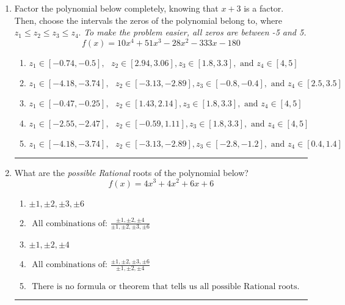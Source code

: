 \documentclass[14pt]{extbook}
\newcommand{\litem}[1]{\item#1\hspace*{-1cm}\rule{\textwidth}{0.4pt}}
\begin{document}
\begin{enumerate}
{\begin{enumerate}[label=\Alph*.]
\end{enumerate} }
\litem{
Factor the polynomial below completely, knowing that $x + 3$ is a factor. Then, choose the intervals the zeros of the polynomial belong to, where $z_1 \leq z_2 \leq z_3 \leq z_4$. \textit{To make the problem easier, all zeros are between -5 and 5.}\[ f(x) = 10x^{4} +51 x^{3} -28 x^{2} -333 x -180 \]\begin{enumerate}[label=\Alph*.]
\item \( z_1 \in [-0.74, -0.5], \text{   }  z_2 \in [2.94, 3.06], z_3 \in [1.8, 3.3], \text{   and   } z_4 \in [4, 5] \)
\item \( z_1 \in [-4.18, -3.74], \text{   }  z_2 \in [-3.13, -2.89], z_3 \in [-0.8, -0.4], \text{   and   } z_4 \in [2.5, 3.5] \)
\item \( z_1 \in [-0.47, -0.25], \text{   }  z_2 \in [1.43, 2.14], z_3 \in [1.8, 3.3], \text{   and   } z_4 \in [4, 5] \)
\item \( z_1 \in [-2.55, -2.47], \text{   }  z_2 \in [-0.59, 1.11], z_3 \in [1.8, 3.3], \text{   and   } z_4 \in [4, 5] \)
\item \( z_1 \in [-4.18, -3.74], \text{   }  z_2 \in [-3.13, -2.89], z_3 \in [-2.8, -1.2], \text{   and   } z_4 \in [0.4, 1.4] \)

\end{enumerate} }
\litem{
What are the \textit{possible Rational} roots of the polynomial below?\[ f(x) = 4x^{3} +4 x^{2} +6 x + 6 \]\begin{enumerate}[label=\Alph*.]
\item \( \pm 1,\pm 2,\pm 3,\pm 6 \)
\item \( \text{ All combinations of: }\frac{\pm 1,\pm 2,\pm 4}{\pm 1,\pm 2,\pm 3,\pm 6} \)
\item \( \pm 1,\pm 2,\pm 4 \)
\item \( \text{ All combinations of: }\frac{\pm 1,\pm 2,\pm 3,\pm 6}{\pm 1,\pm 2,\pm 4} \)
\item \( \text{ There is no formula or theorem that tells us all possible Rational roots.} \)

\end{enumerate} }
\end{enumerate}
\end{document}
